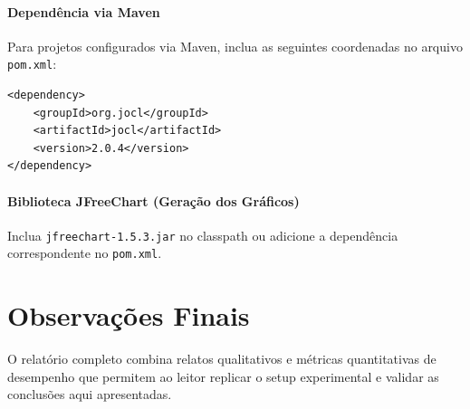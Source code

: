 \documentclass[11pt,a4paper]{article}
\begin{document}
\paragraph{Dependência via Maven}
Para projetos configurados via Maven, inclua as seguintes coordenadas no arquivo \texttt{pom.xml}:
\begin{verbatim}
<dependency>
	<groupId>org.jocl</groupId>
	<artifactId>jocl</artifactId>
	<version>2.0.4</version>
</dependency>
\end{verbatim}

\paragraph{Biblioteca JFreeChart (Geração dos Gráficos)}
Inclua \texttt{jfreechart-1.5.3.jar} no classpath ou adicione a dependência correspondente no \texttt{pom.xml}.

\section{Observações Finais}
O relatório completo combina relatos qualitativos e métricas quantitativas de desempenho que permitem ao leitor replicar o setup experimental e validar as conclusões aqui apresentadas.
\end{document}
